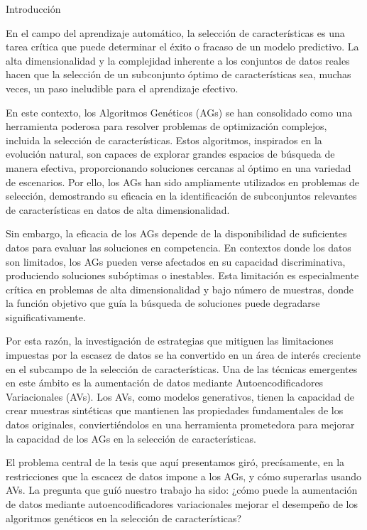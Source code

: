 
Introducción 

En el campo del aprendizaje automático, la selección de características es una tarea crítica que puede determinar el éxito o fracaso de un modelo predictivo. La alta dimensionalidad y la complejidad inherente a los conjuntos de datos reales hacen que la selección de un subconjunto óptimo de características sea, muchas veces, un paso ineludible para el aprendizaje efectivo.

En este contexto, los Algoritmos Genéticos (AGs) se han consolidado como una herramienta poderosa para resolver problemas de optimización complejos, incluida la selección de características. Estos algoritmos, inspirados en la evolución natural, son capaces de explorar grandes espacios de búsqueda de manera efectiva, proporcionando soluciones cercanas al óptimo en una variedad de escenarios. Por ello, los AGs han sido ampliamente utilizados en problemas de selección, demostrando su eficacia en la identificación de subconjuntos relevantes de características en datos de alta dimensionalidad.

Sin embargo, la eficacia de los AGs depende de la disponibilidad de suficientes datos para evaluar las soluciones en competencia. En contextos donde los datos son limitados, los AGs pueden verse afectados en su capacidad discriminativa, produciendo soluciones subóptimas o inestables. Esta limitación es especialmente crítica en problemas de alta dimensionalidad y bajo número de muestras, donde la función objetivo que guía la búsqueda de soluciones puede degradarse significativamente.

Por esta razón, la investigación de estrategias que mitiguen las limitaciones impuestas por la escasez de datos se ha convertido en un área de interés creciente en el subcampo de la selección de características. Una de las técnicas emergentes en este ámbito es la aumentación de datos mediante Autoencodificadores Variacionales (AVs). Los AVs, como modelos generativos, tienen la capacidad de crear muestras sintéticas que mantienen las propiedades fundamentales de los datos originales, conviertiéndolos en una herramienta prometedora para mejorar la capacidad de los AGs en la selección de características.

El problema central de la tesis que aquí presentamos giró, precísamente, en la restricciones que la escacez de datos impone a los AGs, y cómo superarlas usando AVs. La pregunta que guíó nuestro trabajo ha sido: ¿cómo puede la aumentación de datos mediante autoencodificadores variacionales mejorar el desempeño de los algoritmos genéticos en la selección de características?


